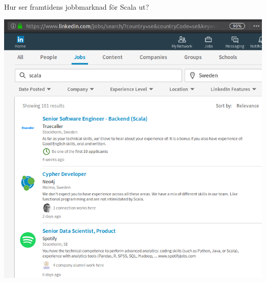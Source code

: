 \begin{Slide}{Hur ser framtidens jobbmarknad för Scala ut?}
\begin{minipage}{1.0\textwidth}
\begin{minipage}{0.48\textwidth}
\includegraphics[width=1.2\textwidth]{../img/w14/scala-jobs-sweden-linkedin-2017-dec07.png}
\end{minipage}
\end{minipage}
\end{Slide}




